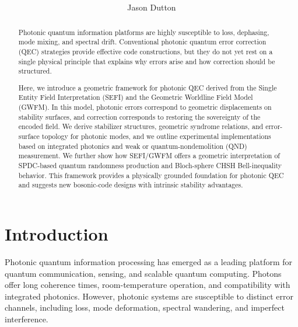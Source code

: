 \documentclass[aip, adv, reprint, superscriptaddress]{revtex4-2}
\begin{document}
\title{
}

\author{Jason Dutton}

\begin{abstract}

Photonic quantum information platforms are highly susceptible to loss, dephasing, mode 
mixing, and spectral drift. Conventional photonic quantum error correction (QEC) 
strategies provide effective code constructions, but they do not yet rest on a single 
physical principle that explains why errors arise and how correction should be structured.

Here, we introduce a geometric framework for photonic QEC derived from the Single 
Entity Field Interpretation (SEFI) and the Geometric Worldline Field Model (GWFM). In 
this model, photonic errors correspond to geometric displacements on stability surfaces, 
and correction corresponds to restoring the sovereignty of the encoded field. We derive 
stabilizer structures, geometric syndrome relations, and error-surface topology for 
photonic modes, and we outline experimental implementations based on integrated 
photonics and weak or quantum-nondemolition (QND) measurement. We further show 
how SEFI/GWFM offers a geometric interpretation of SPDC-based quantum randomness 
production and Bloch-sphere CHSH Bell-inequality behavior. This framework provides a 
physically grounded foundation for photonic QEC and suggests new bosonic-code designs 
with intrinsic stability advantages.
\end{abstract}


\maketitle

\section{Introduction}


Photonic quantum information processing has emerged as a leading platform for quantum 
communication, sensing, and scalable quantum computing. Photons offer long coherence 
times, room-temperature operation, and compatibility with integrated photonics. However, 
photonic systems are susceptible to distinct error channels, including loss, mode 
deformation, spectral wandering, and imperfect interference.
\end{document}
